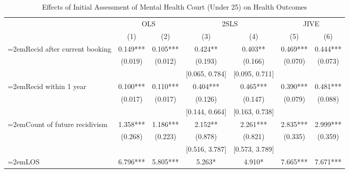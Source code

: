 \begin{table}[htbp]\centering
\small
\caption{Effects of Initial Assessment of Mental Health Court (Under 25) on Health Outcomes}\label{tab:mainmh}
\begin{center}
\begin{adjustbox}{width=\textwidth, totalheight=\baselineskip,keepaspectratio}
\begin{threeparttable}
\begin{tabular}{p{}*{6}{c}}
\toprule
                    &\multicolumn{2}{c}{OLS}        &\multicolumn{2}{c}{2SLS}       &\multicolumn{2}{c}{JIVE}       \\\cmidrule(lr){2-3}\cmidrule(lr){4-5}\cmidrule(lr){6-7}
                    &\multicolumn{1}{c}{(1)}   &\multicolumn{1}{c}{(2)}   &\multicolumn{1}{c}{(3)}   &\multicolumn{1}{c}{(4)}   &\multicolumn{1}{c}{(5)}   &\multicolumn{1}{c}{(6)}   \\
\midrule
{\hangindent=2emRecid after current booking}&       0.149***&       0.105***&       0.424** &       0.403** &       0.469***&       0.444***\\
                    &     (0.019)   &     (0.012)   &     (0.193)   &     (0.166)   &     (0.070)   &     (0.073)   \\
                    &            &            &[0.065, 0.784]   &[0.095, 0.711]   &            &            \\
{\hangindent=2emRecid within 1 year}&       0.100***&       0.110***&       0.404***&       0.465***&       0.390***&       0.481***\\
                    &     (0.017)   &     (0.017)   &     (0.126)   &     (0.147)   &     (0.079)   &     (0.088)   \\
                    &            &            &[0.144, 0.664]   &[0.163, 0.738]   &            &            \\
{\hangindent=2emCount of future recidivism}&       1.358***&       1.186***&       2.152** &       2.261***&       2.835***&       2.999***\\
                    &     (0.268)   &     (0.223)   &     (0.878)   &     (0.821)   &     (0.335)   &     (0.359)   \\
                    &            &            &[0.516, 3.787]   &[0.573, 3.789]   &            &            \\
{\hangindent=2emLOS}&       6.796***&       5.805***&       5.263*  &       4.910*  &       7.665***&       7.671***\\

\end{tabular}
\end{threeparttable}
\end{adjustbox}
\end{center}
\end{table}
